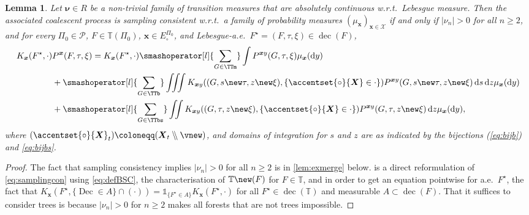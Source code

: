 \documentclass[reqno,draft]{amsart}
\numberwithin{equation}{section}
\theoremstyle{plain}
\newtheorem{lemma}[theorem]{Lemma}
\theoremstyle{remark}
\newcommand{\N}{\mathbb{N}} %
\newcommand*\diff{\mathop{}\!\mathrm{d}}
\newcommand{\ind}{\mathds{1}}
\newcommand{\fpart}{\Pi} %
\newcommand{\nurates}{R} %
\DeclareMathOperator{\dcb}{dec}
\DeclareMathOperator{\dc}{Dec}
\newcommand{\wo}{\mathbin{{\setminus}\mspace{-5mu}{\setminus}}}
\newcommand{\nut}[1]{|\nu_{#1}|}
\newcommand{\rs}[1]{\accentset{\circ}{#1}} %
\begin{document}
\begin{lemma}\label{lem:consPxKx}
    Let $\boldsymbol \nu \in \nurates$ be a non-trivial family of transition measures that are absolutely continuous w.r.t.\ Lebesgue measure. %
    Then the associated coalescent process is sampling consistent w.r.t.\ a family of probability measures $(\mu_{\boldsymbol x})_{\boldsymbol x\in \mathcal{X}}$ if and only if $\nut{n} > 0$ for all $n\ge 2$, and for every $\fpart_0\in \mathcal{P}$, $F\in \mathbb{T}(\fpart_0)$, $\boldsymbol x\in E^{\fpart_0}_\circ $, and Lebesgue-a.e.\ $F^\star = (F,\tau,\xi) \in \dcb(F)$,
    \begin{align}
        K_{\boldsymbol x}(F^\star,\cdot )
        &P^{\boldsymbol x}(F,\tau,\xi)
        =  K_{\boldsymbol x}(F^\star,\cdot )\smashoperator[l]{\sum_{G\in \TTm}} \int P^{\boldsymbol x y}(G,\tau,\xi) \mu_{\boldsymbol x}(\diff y)\nonumber\\
        & + \smashoperator[l]{\sum_{G\in \TTb}} \iiint K_{\boldsymbol xy}((G,s\new\tau,z\new\xi),\{\rs{\boldsymbol X}\in\cdot \}) P^{\boldsymbol x y}(G,s\new\tau,z\new\xi) \diff s\diff z \mu_{\boldsymbol x}(\diff y) \label{eq:consPxKx}\\
        & + \smashoperator[l]{\sum_{G\in \TTbs}} \iint K_{\boldsymbol xy}((G,\tau,z\new\xi),\{\rs{\boldsymbol X}\in\cdot \}) P^{\boldsymbol x y}(G,\tau,z\new\xi) \diff z\mu_{\boldsymbol x}(\diff y)\nonumber,
    \end{align}
    where $(\rs{\boldsymbol X}_t) \coloneqq (\boldsymbol X_t \wo \vnew)$, and domains of integration for $s$ and $z$ are as indicated by the bijections \textup{(\ref{eq:bijb})} and \cref{eq:bijbs}.
\end{lemma}
\begin{proof}
    The fact that sampling consistency implies $\nut{n} > 0$ for all $n\ge 2$ is in \cref{lem:exmerge} below.
     is a direct reformulation of \cref{eq:samplingcon} using \cref{eq:defBSC}, the characterisation of $\mathbb{T}\new(F)$ for $F\in \mathbb{T}$, and in order to get an equation pointwise for a.e.\ $F^\star$, the fact that $K_{\boldsymbol x}(F^\star, \{\dc \in A\} \cap (\cdot )) = \ind_{\{F^\star\in A\}} K_{\boldsymbol x}(F^\star,\cdot )$ for all $F^\star \in \dcb(\mathbb{T})$ and measurable $A \subset \dcb(F)$. That it suffices to consider trees is because $\nut{n} > 0$ for $n\ge 2$ makes all forests that are not trees impossible.
\end{proof}
\end{document}
